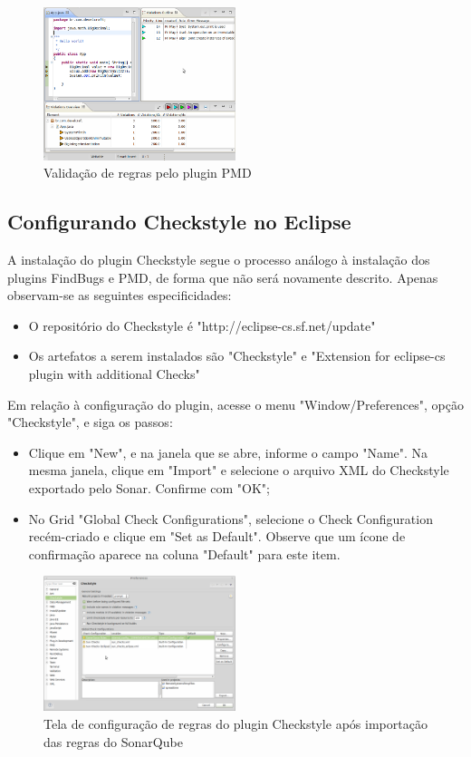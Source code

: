 \documentclass[12pt,journal,compsoc]{IEEEtran}
\begin{document}
\begin{figure}[ht!]
\centering
\includegraphics[width=0.5\textwidth]{img/eclipse-pmd-02}
\caption{Validação de regras pelo plugin PMD}
\label{eclipse-pmd-02}
\end{figure}

 
\subsection{Configurando Checkstyle no Eclipse}

A instalação do plugin Checkstyle\cite{checkstyle_eclipse_plugin} segue o processo análogo à instalação dos plugins FindBugs e PMD, de forma que não será novamente descrito. Apenas observam-se as seguintes especificidades:

\begin{itemize}
\item O repositório do Checkstyle é "http://eclipse-cs.sf.net/update"
\item Os artefatos a serem instalados são "Checkstyle" e "Extension for eclipse-cs plugin with additional Checks"
\end{itemize}
  
Em relação à configuração do plugin, acesse o menu "Window/Preferences", opção "Checkstyle", e siga os passos:

\begin{itemize}
\item Clique em "New", e na janela que se abre, informe o campo "Name". Na mesma janela, clique em "Import" e selecione o arquivo XML do Checkstyle exportado pelo Sonar. Confirme com "OK"; 
\item No Grid "Global Check Configurations", selecione o Check Configuration recém-criado e clique em "Set as Default". Observe que um ícone de confirmação aparece na coluna "Default" para este item.
\end{itemize}

\begin{figure}[ht!]
\centering
\includegraphics[width=0.5\textwidth]{img/eclipse-checkstyle-01}
\caption{Tela de configuração de regras do plugin Checkstyle após importação das regras do SonarQube}
\label{eclipse-checkstyle-01}
\end{figure}
\end{document}
